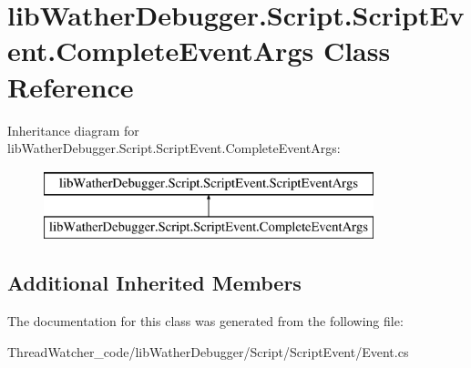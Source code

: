 \hypertarget{classlib_wather_debugger_1_1_script_1_1_script_event_1_1_complete_event_args}{\section{lib\+Wather\+Debugger.\+Script.\+Script\+Event.\+Complete\+Event\+Args Class Reference}
\label{classlib_wather_debugger_1_1_script_1_1_script_event_1_1_complete_event_args}
}
Inheritance diagram for lib\+Wather\+Debugger.\+Script.\+Script\+Event.\+Complete\+Event\+Args\+:\begin{figure}[H]
\begin{center}
\leavevmode
\includegraphics[height=2.000000cm]{classlib_wather_debugger_1_1_script_1_1_script_event_1_1_complete_event_args}
\end{center}
\end{figure}
\subsection*{Additional Inherited Members}


The documentation for this class was generated from the following file\+:\begin{DoxyCompactItemize}
\item 
Thread\+Watcher\+\_\+code/lib\+Wather\+Debugger/\+Script/\+Script\+Event/Event.\+cs\end{DoxyCompactItemize}
